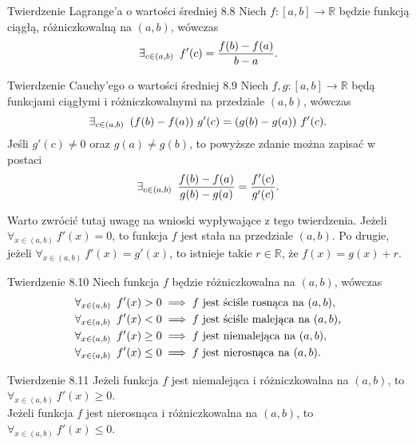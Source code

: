 \documentclass{article}
\newcommand{\hquad}{\mkern9mu}
\newcommand{\R}{\mathbb{R}}
\begin{document}
\begin{twier}{Twierdzenie Lagrange'a o wartości średniej 8.8}
    Niech $f:[a,b]\to\R$ będzie funkcją ciągłą, różniczkowalną na $(a,b)$, wówczas
    \begin{equation*}
        \exists_{c\in(a,b)}\hquad f'(c)=\frac{f(b)-f(a)}{b-a}.
    \end{equation*}
\end{twier}

\begin{twier}{Twierdzenie Cauchy'ego o wartości średniej 8.9}
    Niech $f,g:[a,b]\to\R$ będą funkcjami ciągłymi i różniczkowalnymi na przedziale $(a,b)$, wówczas
    \begin{equation*}
        \exists_{c\in(a,b)}\hquad (f(b)-f(a))\ g'(c) = (g(b)-g(a))\ f'(c).
    \end{equation*}
    Jeśli $g'(c)\neq0$ oraz $g(a)\neq g(b)$, to powyższe zdanie można zapisać w postaci
    \begin{equation*}
        \exists_{c\in(a,b)}\hquad \frac{f(b)-f(a)}{g(b)-g(a)}=\frac{f'(c)}{g'(c)}.
    \end{equation*}
\end{twier}

Warto zwrócić tutaj uwagę na wnioski wypływające z tego twierdzenia. Jeżeli $\forall_{x\in(a,b)}\ f'(x)=0$, to funkcja $f$ jest stała na przedziale $(a,b)$. Po drugie, jeżeli $\forall_{x\in(a,b)}\ f'(x)=g'(x)$, to istnieje takie $r\in\R$, że $f(x)=g(x)+r$.

\begin{twier}{Twierdzenie 8.10}
Niech funkcja $f$ będzie różniczkowalna na $(a,b)$, wówczas
    \begin{align*}
        \forall_{x\in(a,b)}\hquad f'(x)>0&\implies\text{$f$ jest ściśle rosnąca na $(a,b)$},\\
        \forall_{x\in(a,b)}\hquad f'(x)<0&\implies\text{$f$ jest ściśle malejąca na $(a,b)$},\\
        \forall_{x\in(a,b)}\hquad f'(x)\ge0&\implies\text{$f$ jest niemalejąca na $(a,b)$},\\
        \forall_{x\in(a,b)}\hquad f'(x)\le0&\implies\text{$f$ jest nierosnąca na $(a,b)$}.
    \end{align*}
\end{twier}

\begin{twier}{Twierdzenie 8.11}
    Jeżeli funkcja $f$ jest niemalejąca i różniczkowalna na $(a,b)$, to $\forall_{x\in(a,b)}\ f'(x)\ge0$.\\
    Jeżeli funkcja $f$ jest nierosnąca i różniczkowalna na $(a,b)$, to $\forall_{x\in(a,b)}\ f'(x)\le0$.
\end{twier}
\end{document}
